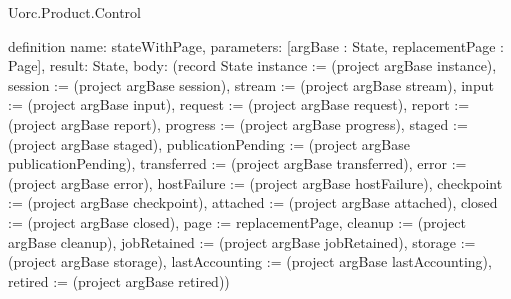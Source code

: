 \begin{lexlean}{Uorc.Product.Control}
\begin{semanticmodule}
definition{
  name: stateWithPage,
  parameters: [argBase : State, replacementPage : Page],
  result: State,
  body: (record State {instance := (project argBase instance), session := (project argBase session), stream := (project argBase stream), input := (project argBase input), request := (project argBase request), report := (project argBase report), progress := (project argBase progress), staged := (project argBase staged), publicationPending := (project argBase publicationPending), transferred := (project argBase transferred), error := (project argBase error), hostFailure := (project argBase hostFailure), checkpoint := (project argBase checkpoint), attached := (project argBase attached), closed := (project argBase closed), page := replacementPage, cleanup := (project argBase cleanup), jobRetained := (project argBase jobRetained), storage := (project argBase storage), lastAccounting := (project argBase lastAccounting), retired := (project argBase retired)})
}


\end{semanticmodule}
\end{lexlean}
